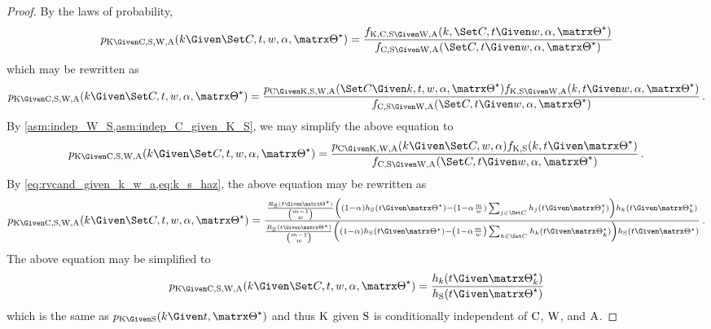 \documentclass[../main.tex]{subfiles}
\begin{document}
\begin{proof}
	By the laws of probability,
	\begin{equation}
	\pmf_{\RV{K} \Given \rvcand, \sv, \RV{W}, \RV{A}}(k \Given \cand, t, w, \alpha, \tparam\sysparam) =
	\frac{\pdf_{\RV{K}, \rvcand, \sv \Given \RV{W}, \RV{A}}(k, \cand, t \Given w, \alpha, \tparam\sysparam)}
	{\pdf_{\rvcand,\sv \Given \RV{W},\RV{A}}(\cand,t \Given w, \alpha, \tparam\sysparam)}
	\end{equation}
	which may be rewritten as
	\begin{equation}
	\pmf_{\RV{K} \Given \rvcand, \sv, \RV{W}, \RV{A}}(k \Given \cand, t, w, \alpha, \tparam\sysparam) =
	\frac{\pmf_{\rvcand \Given \RV{K}, \sv, \RV{W}, \RV{A}}(\cand \Given k, t, w, \alpha, \tparam\sysparam) \pdf_{\RV{K},\sv \Given \RV{W},\RV{A}}(k,t \Given w,\alpha, \tparam\sysparam)}
	{\pdf_{\rvcand,\sv \Given \RV{W},\RV{A}}(\cand,t \Given w, \alpha, \tparam\sysparam)}\,.
	\end{equation}
	By \cref{asm:indep_W_S,asm:indep_C_given_K_S}, we may simplify the above equation to
	\begin{equation}
	\pmf_{\RV{K} \Given \rvcand, \sv, \RV{W}, \RV{A}}(k \Given \cand, t, w, \alpha, \tparam\sysparam) =
	\frac{\pmf_{\rvcand \Given \RV{K}, \RV{W}, \RV{A}}(k \Given \cand, w, \alpha) \pdf_{\RV{K},\sv}(k,t \Given \tparam\sysparam)}
	{\pdf_{\rvcand,\sv \Given \RV{W},\RV{A}}(\cand,t \Given w, \alpha, \tparam\sysparam)}\,.
	\end{equation}	
	By \cref{eq:rvcand_given_k_w_a,eq:k_s_haz}, the above equation may be rewritten as
	\begin{equation}
	\mathsmaller{
		\pmf_{\RV{K} \Given \rvcand, \sv, \RV{W}, \RV{A}}(k \Given \cand, t, w, \alpha, \tparam\sysparam) =
		\frac{
			\frac{\srv_{\sv}(t \Given \tparam\sysparam)}{\binom{m-1}{w}}	
			\left((1-\alpha) \haz_{\sv}(t \Given \tparam\sysparam) - (1-\alpha\frac{m}{w}) \sum_{j \in \cand} \haz_j(t \Given \tparam\sysparam_j)\right)
			\haz_k(t \Given \tparam{\sysparam}_k)
		}
		{
			\frac{
				\srv_{\sv}(t \Given \tparam\sysparam)}{\binom{m-1}{w}}
			\left(
			(1-\alpha) \haz_{\sv}(t \Given \tparam\sysparam) - \left(1-\alpha \frac{m}{w}\right) \sum_{k \in \cand} \haz_k(t \Given \tparam\sysparam_k)
			\right) \haz_{\sv}(t \Given \tparam\sysparam)
	}}\,.
	\end{equation}
	The above equation may be simplified to
	\begin{equation}
	\pmf_{\RV{K} \Given \rvcand, \sv, \RV{W}, \RV{A}}(k \Given \cand, t, w, \alpha, \tparam\sysparam) =
	\frac
	{
		\haz_k(t \Given \tparam{\sysparam}_k)
	}
	{
		\haz_{\sv}(t \Given \tparam\sysparam)
	}
	\end{equation}
	which is the same as $\pmf_{\RV{K} \Given \sv}(k \Given t, \tparam\sysparam)$ and thus $\mathrm{K}$ given $\mathrm{S}$ is conditionally independent of $\mathrm{C}$, $\mathrm{W}$, and $\mathrm{A}$.
\end{proof}
\end{document}

